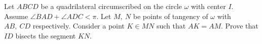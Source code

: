 Let $ABCD$ be a quadrilateral circumscribed on the circle $\omega$ with center $I$. Assume $\angle BAD+ \angle ADC <\pi$. Let $M, \ N$ be points of tangency of $\omega $ with $AB, \ CD$ respectively. Consider a point $K \in MN$ such that $AK=AM$. Prove that $ID$ bisects the segment $KN$.